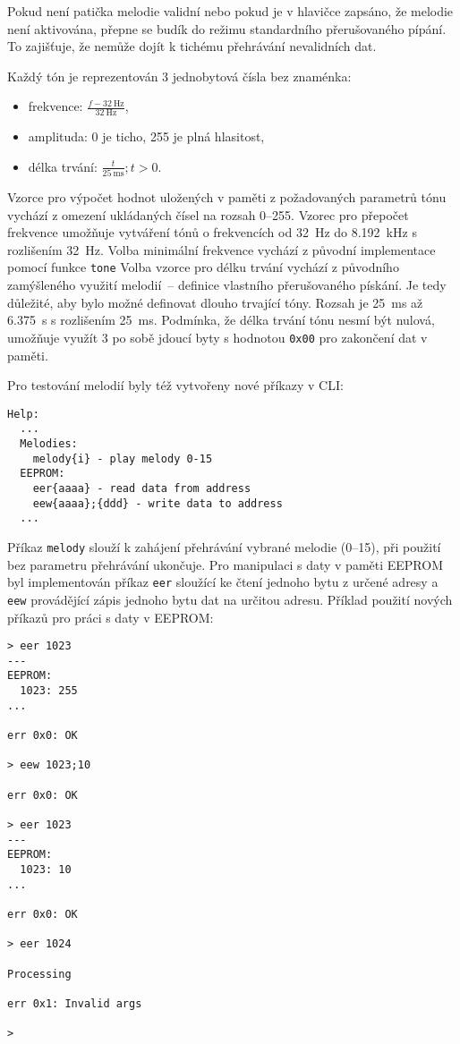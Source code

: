 Pokud není patička melodie validní nebo pokud je v hlavičce zapsáno, že melodie
není aktivována, přepne se budík do režimu standardního přerušovaného pípání.
To zajišťuje, že nemůže dojít k tichému přehrávání nevalidních dat.

Každý tón je reprezentován 3 jednobytová čísla bez znaménka:
\begin{itemize}[nosep]
    \item frekvence: $\frac{f - \SI{32}{\hertz}}{\SI{32}{\hertz}}$,
    \item amplituda: \num{0} je ticho, \num{255} je plná hlasitost,
    \item délka trvání: $\frac{t}{\SI{25}{\milli\second}}; t > 0$.
\end{itemize}

Vzorce pro výpočet hodnot uložených v paměti z požadovaných parametrů tónu
vychází z omezení ukládaných čísel na rozsah \numrange{0}{255}.
Vzorec pro přepočet frekvence umožňuje vytváření tónů o frekvencích od
\SI{32}{\hertz} do \SI{8,192}{\kilo\hertz} s rozlišením \SI{32}{\hertz}.
Volba minimální frekvence vychází z původní implementace pomocí funkce \verb|tone|
Volba vzorce pro délku trvání vychází z původního zamýšleného využití
melodií~-- definice vlastního přerušovaného pískání. Je tedy důležité, aby bylo
možné definovat dlouho trvající tóny. Rozsah je \SI{25}{\milli\second} až
\SI{6,375}{\second} s rozlišením \SI{25}{\milli\second}. Podmínka, že délka
trvání tónu nesmí být nulová, umožňuje využít 3 po sobě jdoucí byty s hodnotou
\texttt{0x00} pro zakončení dat v paměti.

Pro testování melodií byly též vytvořeny nové příkazy v CLI:
\begin{lstlisting}[style=terminal]
Help:
  ...
  Melodies:
    melody{i} - play melody 0-15
  EEPROM:
    eer{aaaa} - read data from address
    eew{aaaa};{ddd} - write data to address
  ...
\end{lstlisting}

Příkaz \verb|melody| slouží k zahájení přehrávání vybrané melodie
(\numrange{0}{15}), při použití bez parametru přehrávání ukončuje.
Pro manipulaci s daty v paměti EEPROM byl implementován příkaz
\verb|eer| sloužící ke čtení jednoho bytu z určené adresy a \verb|eew|
provádějící zápis jednoho bytu dat na určitou adresu. Příklad použití nových
příkazů pro práci s daty v EEPROM:
\begin{lstlisting}[style=terminal]
> eer 1023
---
EEPROM:
  1023: 255
...

err 0x0: OK

> eew 1023;10

err 0x0: OK

> eer 1023
---
EEPROM:
  1023: 10
...

err 0x0: OK

> eer 1024

Processing

err 0x1: Invalid args

>
\end{lstlisting}


